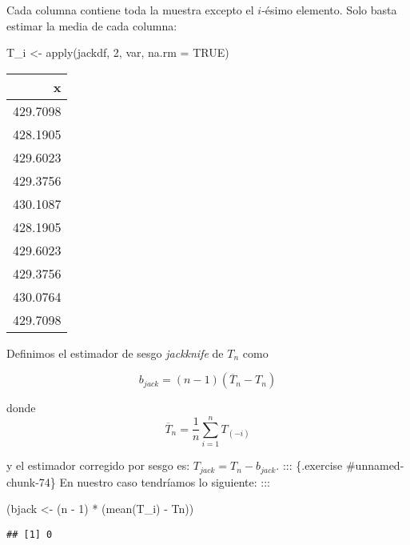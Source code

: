 \documentclass[
  12pt,
]{book}
\newenvironment{Shaded}{\begin{snugshade}}{\end{snugshade}}
\newcommand{\AttributeTok}[1]{\textcolor[rgb]{0.77,0.63,0.00}{#1}}
\newcommand{\ConstantTok}[1]{\textcolor[rgb]{0.00,0.00,0.00}{#1}}
\newcommand{\DecValTok}[1]{\textcolor[rgb]{0.00,0.00,0.81}{#1}}
\newcommand{\FunctionTok}[1]{\textcolor[rgb]{0.00,0.00,0.00}{#1}}
\newcommand{\NormalTok}[1]{#1}
\newcommand{\OtherTok}[1]{\textcolor[rgb]{0.56,0.35,0.01}{#1}}
\newcommand{\SpecialCharTok}[1]{\textcolor[rgb]{0.00,0.00,0.00}{#1}}
\theoremstyle{definition}
\theoremstyle{definition}
\theoremstyle{definition}
\theoremstyle{definition}
\theoremstyle{remark}
\begin{document}
Cada columna contiene toda la muestra excepto el \(i\)-ésimo
elemento. Solo basta estimar la media de cada columna:

\begin{Shaded}
\begin{Highlighting}[]
\NormalTok{T\_i }\OtherTok{\textless{}{-}} \FunctionTok{apply}\NormalTok{(jackdf, }\DecValTok{2}\NormalTok{, var, }\AttributeTok{na.rm =} \ConstantTok{TRUE}\NormalTok{)}
\end{Highlighting}
\end{Shaded}

\begin{tabular}{r}
\hline
x\\
\hline
429.7098\\
\hline
428.1905\\
\hline
429.6023\\
\hline
429.3756\\
\hline
430.1087\\
\hline
428.1905\\
\hline
429.6023\\
\hline
429.3756\\
\hline
430.0764\\
\hline
429.7098\\
\hline
\end{tabular}

Definimos el estimador de sesgo \emph{jackknife} de \(T_n\) como

\begin{equation*}
b_{jack} = (n-1) (\overline{T}_{n} - T_{n})
\end{equation*}

donde
\begin{equation*}
\overline{T}_{n} = \frac{1}{n} \sum_{i=1}^{n} T_{(-i)}
\end{equation*}

y el estimador corregido por sesgo es: \(T_{jack}=T_n-b_{jack}\).
::: \{.exercise \#unnamed-chunk-74\}
En nuestro caso tendríamos lo siguiente:
:::

\begin{Shaded}
\begin{Highlighting}[]
\NormalTok{(bjack }\OtherTok{\textless{}{-}}\NormalTok{ (n }\SpecialCharTok{{-}} \DecValTok{1}\NormalTok{) }\SpecialCharTok{*}\NormalTok{ (}\FunctionTok{mean}\NormalTok{(T\_i) }\SpecialCharTok{{-}}\NormalTok{ Tn))}
\end{Highlighting}
\end{Shaded}

\begin{verbatim}
## [1] 0
\end{verbatim}
\end{document}
